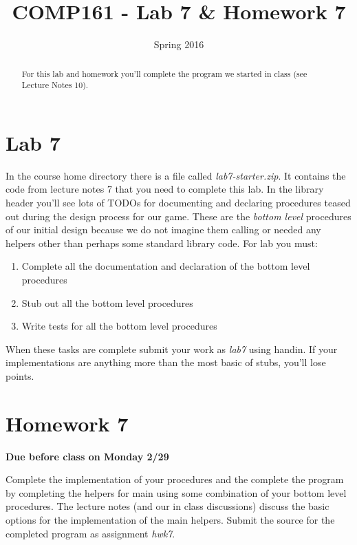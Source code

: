 \documentclass[nobib]{tufte-handout}
\title{COMP161 - Lab 7 \& Homework 7}
\author{}
\date{Spring 2016}
\begin{document}
\maketitle

\begin{abstract}
For this lab and homework you'll complete the program we started in class (see Lecture Notes 10).
\end{abstract}

\section{Lab 7}

In the course home directory there is a file called \textit{lab7-starter.zip}. It contains the code from lecture notes 7 that you need to complete this lab. In the library header you'll see lots of TODOs for documenting and declaring procedures teased out during the design process for our game. These are the \textit{bottom level} procedures of our initial design because we do not imagine them calling or needed any helpers other than perhaps some standard library code. For lab you must:
\begin{enumerate}
\item Complete all the documentation and declaration of the bottom level procedures 
\item Stub out all the bottom level procedures
\item Write tests for all the bottom level procedures
\end{enumerate}
When these tasks are complete submit your work as \textit{lab7} using handin. If your implementations are anything more than the most basic of stubs, you'll lose points. 

\section{Homework 7}

\begin{center}
\textbf{Due before class on Monday 2/29}
\end{center}

Complete the implementation of your procedures and the complete the program by completing the helpers for main using some combination of your bottom level procedures. The lecture notes (and our in class discussions) discuss the basic options for the implementation of the main helpers. Submit the source for the completed program as assignment \textit{hwk7}. 
\end{document}
